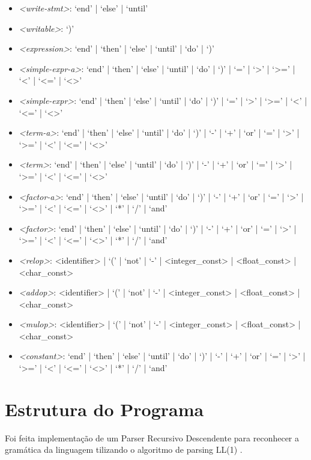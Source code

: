 \begin{itemize}
\begin{itemize}
            \item \textit{<write-stmt>}: `end' | `else' | `until' 
            \item \textit{<writable>}: `)'
            \item \textit{<expression>}: `end' | `then' | `else' | `until' | `do' | `)'
            \item \textit{<simple-expr-a>}: `end' | `then' | `else' | `until' | `do' | `)' | `=' | `>' | `>=' | `<' | `<=' | `<>'
            \item \textit{<simple-expr>}: `end' | `then' | `else' | `until' | `do' | `)' | `=' | `>' | `>=' | `<' | `<=' | `<>'
            \item \textit{<term-a>}: `end' | `then' | `else' | `until' | `do' | `)' | `-' | `+' | `or' | `=' | `>' | `>=' | `<' | `<=' | `<>'
            \item \textit{<term>}: `end' | `then' | `else' | `until' | `do' | `)' | `-' | `+' | `or' | `=' | `>' | `>=' | `<' | `<=' | `<>'
            \item \textit{<factor-a>}: `end' | `then' | `else' | `until' | `do' | `)' | `-' | `+' | `or' | `=' | `>' | `>=' | `<' | `<=' | `<>' | `*' | `/' | `and'
            \item \textit{<factor>}: `end' | `then' | `else' | `until' | `do' | `)' | `-' | `+' | `or' | `=' | `>' | `>=' | `<' | `<=' | `<>' | `*' | `/' | `and'
            \item \textit{<relop>}: <identifier> | `(' | `not' | `-' | <integer_const> | <float_const> | <char_const>
            \item \textit{<addop>}: <identifier> | `(' | `not' | `-' | <integer_const> | <float_const> | <char_const>
            \item \textit{<mulop>}: <identifier> | `(' | `not' | `-' | <integer_const> | <float_const> | <char_const>
            \item \textit{<constant>}: `end' | `then' | `else' | `until' | `do' | `)' | `-' | `+' | `or' | `=' | `>' | `>=' | `<' | `<=' | `<>' | `*' | `/' | `and'
        \end{itemize}
    \end{itemize}
    
\section{Estrutura do Programa}
Foi feita implementação de um Parser Recursivo Descendente para reconhecer a gramática da linguagem tilizando o algoritmo de parsing LL(1) .

